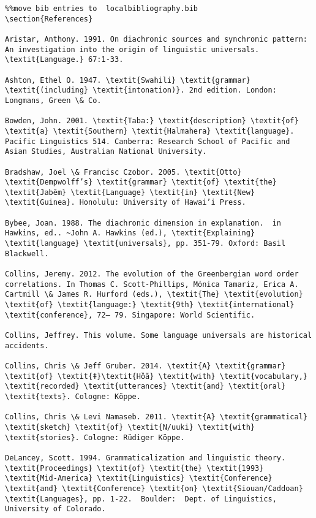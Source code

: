 \documentclass[output=paper]{langsci/langscibook}
\begin{document}
\begin{verbatim}%%move bib entries to  localbibliography.bib
\section{References}

Aristar, Anthony. 1991. On diachronic sources and synchronic pattern:  An investigation into the origin of linguistic universals.  \textit{Language.} 67:1-33.

Ashton, Ethel O. 1947. \textit{Swahili} \textit{grammar} \textit{(including} \textit{intonation)}. 2nd edition. London: Longmans, Green \& Co.

Bowden, John. 2001. \textit{Taba:} \textit{description} \textit{of} \textit{a} \textit{Southern} \textit{Halmahera} \textit{language}. Pacific Linguistics 514. Canberra: Research School of Pacific and Asian Studies, Australian National University.

Bradshaw, Joel \& Francisc Czobor. 2005. \textit{Otto} \textit{Dempwolff’s} \textit{grammar} \textit{of} \textit{the} \textit{Jabêm} \textit{Language} \textit{in} \textit{New} \textit{Guinea}. Honolulu: University of Hawai’i Press.

Bybee, Joan. 1988. The diachronic dimension in explanation.  in Hawkins, ed.. ~John A. Hawkins (ed.), \textit{Explaining} \textit{language} \textit{universals}, pp. 351-79. Oxford: Basil Blackwell.

Collins, Jeremy. 2012. The evolution of the Greenbergian word order correlations. In Thomas C. Scott-Phillips, Mónica Tamariz, Erica A. Cartmill \& James R. Hurford (eds.), \textit{The} \textit{evolution} \textit{of} \textit{language:} \textit{9th} \textit{international} \textit{conference}, 72– 79. Singapore: World Scientific.

Collins, Jeffrey. This volume. Some language universals are historical accidents.

Collins, Chris \& Jeff Gruber. 2014. \textit{A} \textit{grammar} \textit{of} \textit{ǂ}\textit{Hȍã} \textit{with} \textit{vocabulary,} \textit{recorded} \textit{utterances} \textit{and} \textit{oral} \textit{texts}. Cologne: Köppe.

Collins, Chris \& Levi Namaseb. 2011. \textit{A} \textit{grammatical} \textit{sketch} \textit{of} \textit{N/uuki} \textit{with} \textit{stories}. Cologne: Rüdiger Köppe.

DeLancey, Scott. 1994. Grammaticalization and linguistic theory.  \textit{Proceedings} \textit{of} \textit{the} \textit{1993} \textit{Mid-America} \textit{Linguistics} \textit{Conference} \textit{and} \textit{Conference} \textit{on} \textit{Siouan/Caddoan} \textit{Languages}, pp. 1-22.  Boulder:  Dept. of Linguistics, University of Colorado.


\end{verbatim}
\end{document}

